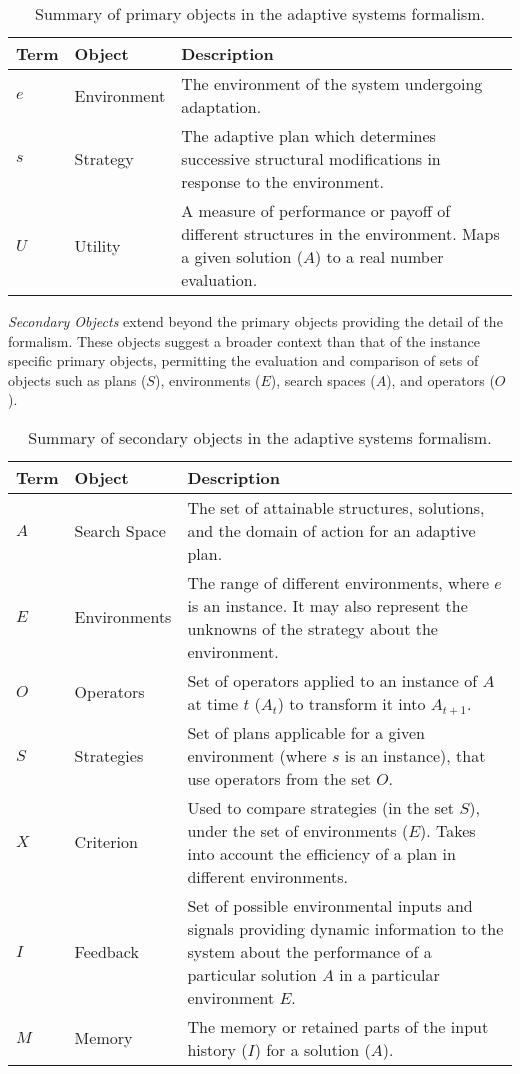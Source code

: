 \documentclass[a4paper, 11pt]{article}
\begin{document}
\begin{table}[ht]
	\centering\small
		\begin{tabularx}{\textwidth}{llX}
		\toprule
		\textbf{Term} & \textbf{Object} & \textbf{Description} \\ 
		\toprule
		$e$ & Environment & The environment of the system undergoing adaptation. \\ 
		\midrule
		$s$ & Strategy & The adaptive plan which determines successive structural modifications in response to the environment. \\ 
		\midrule
		$U$ & Utility & A measure of performance or payoff of different structures in the environment. Maps a given solution ($A$) to a real number evaluation. \\ 
		\bottomrule
		\end{tabularx}	
	\caption{Summary of primary objects in the adaptive systems formalism.}
	\label{tab:adaptsys:primary}
\end{table}

\emph{Secondary Objects} extend beyond the primary objects providing the detail of the formalism. These objects suggest a broader context than that of the instance specific primary objects, permitting the evaluation and comparison of sets of objects such as plans ($S$), environments ($E$), search spaces ($A$), and operators ($O$).

\begin{table}[ht]
	\centering\small
		\begin{tabularx}{\textwidth}{llX}
		\toprule
		\textbf{Term} & \textbf{Object} & \textbf{Description} \\ 
		\toprule
		$A$ & Search Space & The set of attainable structures, solutions, and the domain of action for an adaptive plan. \\ 
		\midrule
		$E$ & Environments & The range of different environments, where $e$ is an instance. It may also represent the unknowns of the strategy about the environment.  \\ 
		\midrule
		$O$ & Operators & Set of operators applied to an instance of $A$ at time $t$ ($A_t$) to transform it into $A_{t+1}$. \\ 
		\midrule
		$S$ & Strategies & Set of plans applicable for a given environment (where $s$ is an instance), that use operators from the set $O$.  \\ 
		\midrule
		$X$ & Criterion & Used to compare strategies (in the set $S$), under the set of environments ($E$). Takes into account the efficiency of a plan in different environments. \\ 
		\midrule
		$I$ & Feedback & Set of possible environmental inputs and signals providing dynamic information to the system about the performance of a particular solution $A$ in a particular environment $E$. \\ 
		\midrule
		$M$ & Memory & The memory or retained parts of the input history ($I$) for a solution ($A$). \\ 
		\bottomrule		
		\end{tabularx}	
	\caption{Summary of secondary objects in the adaptive systems formalism.}
	\label{tab:adaptsys:secondary}
\end{table}
\end{document}
